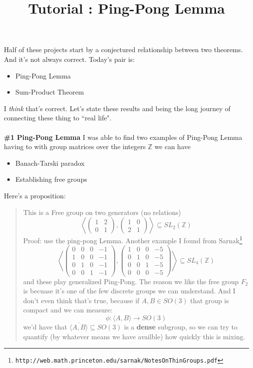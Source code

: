 \documentclass[12pt]{article}
\title{Tutorial : Ping-Pong Lemma}
\date{}
\begin{document}
\selectfont \fontsize{12.5}{15}\selectfont

\maketitle

\noindent Half of these projects start by a conjectured relationship between two theorems.  And it's not always correct.  Today's pair is:
\begin{itemize}
\item Ping-Pong Lemma
\item Sum-Product Theorem
\end{itemize}
I \textit{think} that's correct. Let's state these results and being the long journey of connecting these thing to ``real life". \\ \\
\textbf{\#1 Ping-Pong Lemma} I was able to find two examples of Ping-Pong Lemma having to with group matrices over the integers $\mathbb{Z}$ we can have
\begin{itemize}
\item Banach-Tarski paradox
\item Establishing free groups
\end{itemize}  
Here's a proposition:
\begin{quotation} \noindent This is a Free group on two generators (no relations)
$$ \left\langle \left(\begin{array}{cc} 1 & 2 \\ 0 & 1 \end{array} \right),
\left(\begin{array}{cc} 1 & 0 \\ 2 & 1 \end{array} \right) \right\rangle \subseteq SL_2(\mathbb{Z}) $$
Proof: use the ping-pong Lemma.  Another example I found from Sarnak\footnote{\texttt{http://web.math.princeton.edu/sarnak/NotesOnThinGroups.pdf}} 
$$ \left\langle \left(\begin{array}{cccr} 0 & 0 & 0 & -1 \\
1 & 0 & 0 & -1 \\
0 & 1 & 0 & -1 \\
0 & 0 & 1 & -1 \end{array} \right),
\left(\begin{array}{cccr}
1 & 0 & 0 & -5 \\
0 & 1 & 0 & -5 \\
0 & 0 & 1 & -5 \\ 
 0 & 0 & 0 & -5\end{array} \right)
\right\rangle \subseteq SL_4(\mathbb{Z}) $$
and these play generalized Ping-Pong.  The reason we like the free group $F_2$
is becuase it's one of the few discrete groups we can understand. And I don't even think that's true, because if $A,B \in SO(3)$ that group is compact and we can measure:
$$ \phi: \langle A,B \rangle \to SO(3) $$
we'd have that $\overline{\langle A,B \rangle} \subseteq SO(3)$ is a \textbf{dense} subgroup, so we can try to quantify (by whatever means we have availble) how quickly this is mixing.
\end{quotation}
\end{document}
